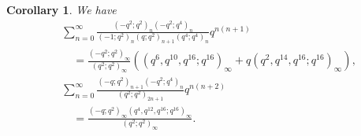 \documentclass[reqno,12pt]{amsart}
\newtheorem{corollary}[theorem]{Corollary}
\theoremstyle{remark}
\numberwithin{equation}{section}
\begin{document}
\begin{corollary}
We have
\begin{align}
&\sum_{n=0}^{\infty}\frac{\left(-q^2;q^2\right)_n
\left(-q^2;q^4\right)_n}
{\left(-1;q^2\right)_{n}\left(q;q^2\right)_{n+1}
\left(q^4;q^4\right)_{n}}q^{n\left(n+1\right)}\nonumber\\
&\quad=\frac{\left(-q^2;q^2\right)_{\infty}
}
{\left(q^2;q^2\right)_{\infty}}\left(\left(q^6,q^{10},q^{16};q^{16}\right)_{\infty}
+q\left(q^2,q^{14},q^{16};q^{16}\right)_{\infty}\right),\tag{S.65}\label{S.65}\\
&\sum_{n=0}^{\infty}\frac{\left(-q;q^2\right)_{n+1}
\left(-q^2;q^4\right)_n}
{\left(q^2;q^2\right)_{2n+1}}q^{n\left(n+2\right)}\nonumber\\
&\quad=\frac{\left(-q;q^2\right)_{\infty}
\left(q^4,q^{12},q^{16};q^{16}\right)_{\infty}}{\left(q^2;q^2\right)_{\infty}
}.\tag{S.70}\label{S.70}
\end{align}
\end{corollary}
\end{document}
